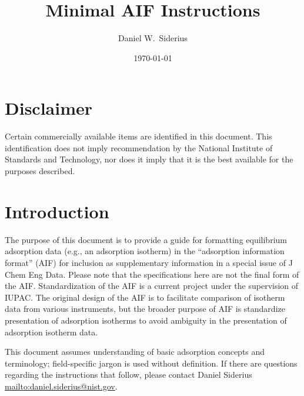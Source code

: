 \documentclass[preprint,pre,showkeys,12pt,superscriptaddress,nofootinbib,endfloats*]{revtex4-1}
\begin{document}
\title{Minimal AIF Instructions
} 

\author{Daniel W.~Siderius}


\date{\today}


\maketitle

\newpage
\section*{Disclaimer}

Certain commercially available items are identified in this document. This identification does not imply recommendation by the National Institute of Standards and Technology, nor does it imply that it is the best available for the purposes described.

\section{Introduction}\label{sec:intro}

The purpose of this document is to provide a guide for formatting equilibrium adsorption data (e.g., an adsorption isotherm) in the ``adsorption information format'' (AIF) for inclusion as supplementary information in a special issue of J Chem Eng Data. Please note that the specifications here are not the final form of the AIF. Standardization of the AIF is a current project under the supervision of IUPAC. The original design of the AIF is to facilitate comparison of isotherm data from various instruments, but the broader purpose of AIF is standardize presentation of adsorption isotherms to avoid ambiguity in the presentation of adsorption isotherm data.

This document assumes understanding of basic adsorption concepts and terminology; field-specific jargon is used without definition. If there are questions regarding the instructions that follow, please contact Daniel Siderius \url{mailto:daniel.siderius@nist.gov}.
\end{document}
